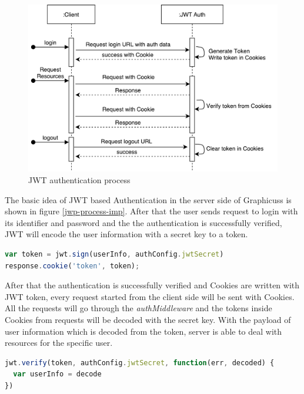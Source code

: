 \begin{figure}[!htbp]
  \centering
    \includegraphics[width=1\textwidth]{Figures/imp-jwt-process.pdf}
  \caption{JWT authentication process}
  \label{fig:jwt-process-imp}
\end{figure}


The basic idea of JWT based Authentication in the server side of Graphicuss is shown in figure \ref{jwp-process-imp}. After that the user sends request to login with its identifier and password and the the authentication is successfully verified, JWT will encode the user information with a secret key to a token.

\begin{lstlisting}[language=JavaScript, caption=JWT encodes user information with secret key, label={list:jwt-encode-imp}]
var token = jwt.sign(userInfo, authConfig.jwtSecret)
response.cookie('token', token);
\end{lstlisting}

After that the authentication is successfully verified and Cookies are written with JWT token, every request started from the client side will be sent with Cookies. All the requests will go through the \textit{authMiddleware} and the tokens inside Cookies from requests will be decoded with the secret key. With the payload of user information which is decoded from the token, server is able to deal with resources for the specific user.

\begin{lstlisting}[language=JavaScript, caption=JWT decodes user information with secret key, label={list:jwt-decode-imp}]
jwt.verify(token, authConfig.jwtSecret, function(err, decoded) {
  var userInfo = decode
})
\end{lstlisting}

